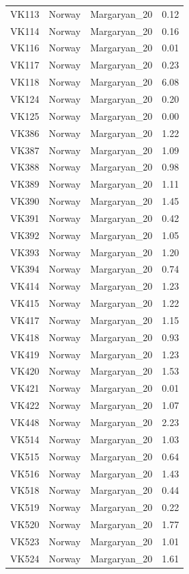 \begin{longtable}[t]{lllr}
VK113 & Norway & Margaryan\_20 & 0.12\\
VK114 & Norway & Margaryan\_20 & 0.16\\
VK116 & Norway & Margaryan\_20 & 0.01\\
VK117 & Norway & Margaryan\_20 & 0.23\\
VK118 & Norway & Margaryan\_20 & 6.08\\
VK124 & Norway & Margaryan\_20 & 0.20\\
VK125 & Norway & Margaryan\_20 & 0.00\\
VK386 & Norway & Margaryan\_20 & 1.22\\
VK387 & Norway & Margaryan\_20 & 1.09\\
VK388 & Norway & Margaryan\_20 & 0.98\\
VK389 & Norway & Margaryan\_20 & 1.11\\
VK390 & Norway & Margaryan\_20 & 1.45\\
VK391 & Norway & Margaryan\_20 & 0.42\\
VK392 & Norway & Margaryan\_20 & 1.05\\
VK393 & Norway & Margaryan\_20 & 1.20\\
VK394 & Norway & Margaryan\_20 & 0.74\\
VK414 & Norway & Margaryan\_20 & 1.23\\
VK415 & Norway & Margaryan\_20 & 1.22\\
VK417 & Norway & Margaryan\_20 & 1.15\\
VK418 & Norway & Margaryan\_20 & 0.93\\
VK419 & Norway & Margaryan\_20 & 1.23\\
VK420 & Norway & Margaryan\_20 & 1.53\\
VK421 & Norway & Margaryan\_20 & 0.01\\
VK422 & Norway & Margaryan\_20 & 1.07\\
VK448 & Norway & Margaryan\_20 & 2.23\\
VK514 & Norway & Margaryan\_20 & 1.03\\
VK515 & Norway & Margaryan\_20 & 0.64\\
VK516 & Norway & Margaryan\_20 & 1.43\\
VK518 & Norway & Margaryan\_20 & 0.44\\
VK519 & Norway & Margaryan\_20 & 0.22\\
VK520 & Norway & Margaryan\_20 & 1.77\\
VK523 & Norway & Margaryan\_20 & 1.01\\
VK524 & Norway & Margaryan\_20 & 1.61\\

\end{longtable}
